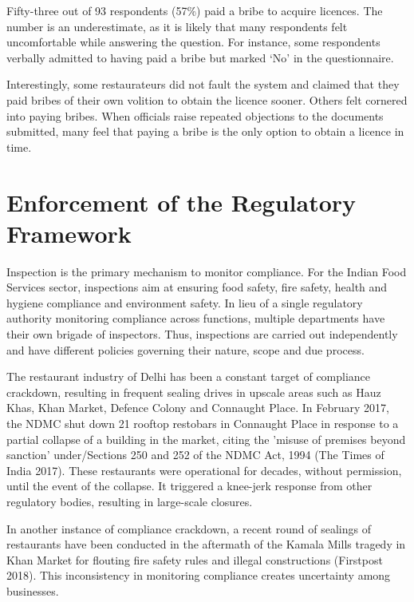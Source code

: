 \documentclass[a4paper, 12pt]{article}
\begin{document}
		Fifty-three out of 93 respondents (57\%) paid a bribe to acquire licences. The number is an underestimate, as it is likely that many respondents felt uncomfortable while answering the question. For instance, some respondents verbally admitted to having 
paid a bribe but marked ‘No’ in the questionnaire.
		
		Interestingly, some restaurateurs did not fault the system and claimed that they paid bribes of their own volition to obtain the licence sooner. Others felt cornered into paying bribes. When officials raise repeated objections to the documents submitted, 
many feel that paying a bribe is the only option to obtain a licence in time.
		
		

	
		\section{Enforcement of the Regulatory Framework}
		\label{sec:2}
		
		Inspection is the primary mechanism to monitor compliance. For the Indian Food Services sector, inspections aim at ensuring food safety, fire safety, health and hygiene compliance and environment safety. In lieu of a single regulatory authority 
monitoring compliance across functions, multiple departments have their own brigade of inspectors. Thus, inspections are carried out independently and have different policies governing their nature, scope and due process.
		
		The restaurant industry of Delhi has been a constant target of compliance crackdown, resulting in frequent sealing drives in upscale areas such as Hauz Khas, Khan Market, Defence Colony and Connaught Place. In February 2017, the NDMC shut down 
21 rooftop restobars in Connaught Place in response to a partial collapse of a building in the market, citing the 'misuse of premises beyond sanction' under/Sections 250 and 252 of the NDMC Act, 1994 (The Times of India 2017). These restaurants were 
operational for decades, without permission, until the event of the collapse. It triggered a knee-jerk response from other regulatory bodies, resulting in large-scale closures.
		
		In another instance of compliance crackdown, a recent round of sealings of restaurants have been conducted in the aftermath of the Kamala Mills tragedy in Khan Market for flouting fire safety rules and illegal constructions (Firstpost 2018). This 
inconsistency in monitoring compliance creates uncertainty among businesses.
		
\end{document}
